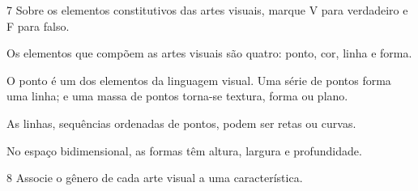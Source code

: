 \num{7} Sobre os elementos constitutivos das artes visuais, marque V para
verdadeiro e F para falso.

\begin{boxlist}
\item Os elementos que compõem as artes visuais são quatro: ponto, cor, linha e forma. 

\item O ponto é um dos elementos da linguagem visual. Uma série de pontos forma uma linha; e uma massa de pontos torna-se textura, forma ou plano. 

\item As linhas, sequências ordenadas de pontos, podem ser retas ou curvas. 

\item No espaço bidimensional, as formas têm altura, largura e profundidade. 
\end{boxlist}

\num{8} Associe o gênero de cada arte visual a uma característica.

